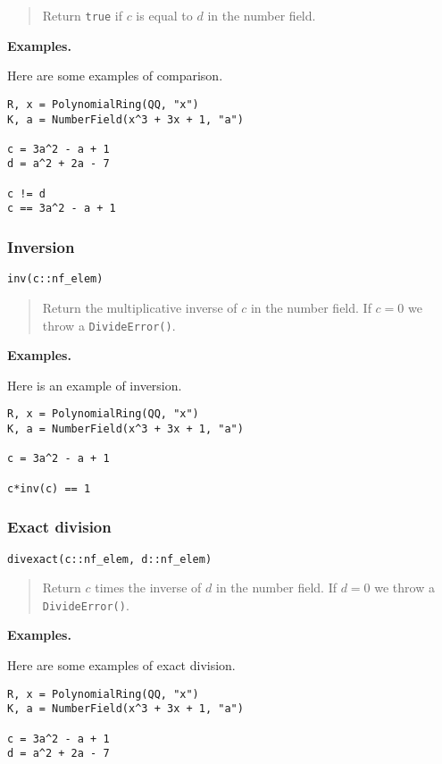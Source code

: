 \documentclass[a4paper,10pt]{article}
\newcommand{\code}{\lstinline}
\newcommand{\desc}[1]{\vspace{-3mm}\begin{quote}#1\end{quote}}
\begin{document}
{{\desc{Return \code{true} if $c$ is equal to $d$ in the number field.}

\textbf{Examples.}

Here are some examples of comparison.

\begin{lstlisting}
R, x = PolynomialRing(QQ, "x")
K, a = NumberField(x^3 + 3x + 1, "a")

c = 3a^2 - a + 1
d = a^2 + 2a - 7

c != d
c == 3a^2 - a + 1
\end{lstlisting}

\subsubsection{Inversion}

\begin{lstlisting}
inv(c::nf_elem)
\end{lstlisting}

\desc{Return the multiplicative inverse of $c$ in the number field. If $c = 0$
we throw a \code{DivideError()}.}

\textbf{Examples.}

Here is an example of inversion.

\begin{lstlisting}
R, x = PolynomialRing(QQ, "x")
K, a = NumberField(x^3 + 3x + 1, "a")

c = 3a^2 - a + 1

c*inv(c) == 1
\end{lstlisting}

\subsubsection{Exact division}

\begin{lstlisting}
divexact(c::nf_elem, d::nf_elem)
\end{lstlisting}

\desc{Return $c$ times the inverse of $d$ in the number field. If $d = 0$ we
throw a \code{DivideError()}.}

\textbf{Examples.}

Here are some examples of exact division.

\begin{lstlisting}
R, x = PolynomialRing(QQ, "x")
K, a = NumberField(x^3 + 3x + 1, "a")

c = 3a^2 - a + 1
d = a^2 + 2a - 7


\end{lstlisting}}}
\end{document}

